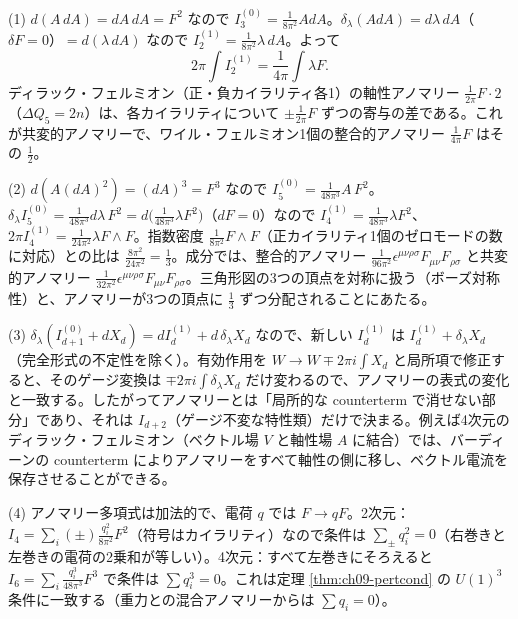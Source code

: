 \begin{solution}
(1) $d(A\,dA)=dA\,dA=F^2$ なので $I_3^{(0)}=\frac1{8\pi^2}AdA$。$\delta_\lambda(AdA)=d\lambda\,dA$（$\delta F=0$）$=d(\lambda\,dA)$ なので $I_2^{(1)}=\frac1{8\pi^2}\lambda\,dA$。よって
\[
2\pi\int I_2^{(1)}=\frac1{4\pi}\int\lambda F .
\]
ディラック・フェルミオン（正・負カイラリティ各1）の軸性アノマリー $\frac1{2\pi}F\cdot2$（$\Delta Q_5=2n$）は、各カイラリティについて $\pm\frac{1}{2\pi}F$ ずつの寄与の差である。これが共変的アノマリーで、ワイル・フェルミオン1個の整合的アノマリー $\frac1{4\pi}F$ はその $\frac12$。

(2) $d(A(dA)^2)=(dA)^3=F^3$ なので $I_5^{(0)}=\frac1{48\pi^3}A\,F^2$。$\delta_\lambda I_5^{(0)}=\frac1{48\pi^3}d\lambda\,F^2=d\bigl(\frac1{48\pi^3}\lambda F^2\bigr)$（$dF=0$）なので $I_4^{(1)}=\frac{1}{48\pi^3}\lambda F^2$、$2\pi I_4^{(1)}=\frac1{24\pi^2}\lambda F\wedge F$。指数密度 $\frac1{8\pi^2}F\wedge F$（正カイラリティ1個のゼロモードの数に対応）との比は $\frac{8\pi^2}{24\pi^2}=\frac13$。成分では、整合的アノマリー $\frac1{96\pi^2}\epsilon^{\mu\nu\rho\sigma}F_{\mu\nu}F_{\rho\sigma}$ と共変的アノマリー $\frac1{32\pi^2}\epsilon^{\mu\nu\rho\sigma}F_{\mu\nu}F_{\rho\sigma}$。三角形図の3つの頂点を対称に扱う（ボーズ対称性）と、アノマリーが3つの頂点に $\frac13$ ずつ分配されることにあたる。

(3) $\delta_\lambda(I^{(0)}_{d+1}+dX_d)=dI^{(1)}_d+d\,\delta_\lambda X_d$ なので、新しい $I^{(1)}_d$ は $I^{(1)}_d+\delta_\lambda X_d$（完全形式の不定性を除く）。有効作用を $W\to W\mp2\pi i\int X_d$ と局所項で修正すると、そのゲージ変換は $\mp2\pi i\int\delta_\lambda X_d$ だけ変わるので、アノマリーの表式の変化と一致する。したがってアノマリーとは「局所的な counterterm で消せない部分」であり、それは $I_{d+2}$（ゲージ不変な特性類）だけで決まる。例えば4次元のディラック・フェルミオン（ベクトル場 $V$ と軸性場 $A$ に結合）では、バーディーンの counterterm によりアノマリーをすべて軸性の側に移し、ベクトル電流を保存させることができる。

(4) アノマリー多項式は加法的で、電荷 $q$ では $F\to qF$。2次元：$I_4=\sum_i(\pm)\frac{q_i^2}{8\pi^2}F^2$（符号はカイラリティ）なので条件は $\sum_\pm q_i^2=0$（右巻きと左巻きの電荷の2乗和が等しい）。4次元：すべて左巻きにそろえると $I_6=\sum_i\frac{q_i^3}{48\pi^3}F^3$ で条件は $\sum q_i^3=0$。これは定理 \ref{thm:ch09-pertcond} の $U(1)^3$ 条件に一致する（重力との混合アノマリーからは $\sum q_i=0$）。
\end{solution}

